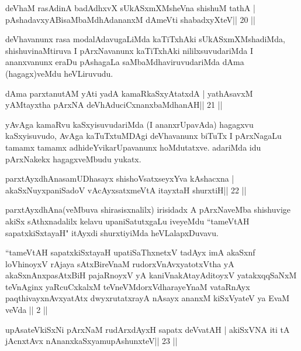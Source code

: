 \begin{shl}
deVhaM rasAdinA badAdhxvX sUkASxmXMsheVna shishuM tathA |
pAshadavxyABisaMbaMdhAdananxM dAmeVti shabadxyXteV\hfill || 20 ||
\end{shl}

\begin{artha}
deVhavanunx rasa modalAdavugaLiMda kaTiTxhAki sUkASxmXMshadiMda, shishuvinaMtiruva I pArxNavanunx kaTiTxhAki nililxsuvudariMda I ananxvanunx eraDu pAshagaLa saMbaMdhaviruvudariMda dAma (hagagx)veMdu heVLiruvudu.
\end{artha}

\begin{shl}
dAma parxtanutAM yAti yadA kamaRkaSxyAtatxdA |
yathAsavxM yAMtayxtha pArxNA deVhAduciCxnanxbaMdhanAH\hfill || 21 ||
\end{shl}

\begin{artha}
yAvAga kamaRvu kaSxyisuvudariMda (I ananxrUpavAda) hagagxvu kaSxyisuvudo, AvAga kaTuTxtuMDAgi deVhavanunx biTuTx I pArxNagaLu tamamx tamamx adhideYvikarUpavanunx hoMdutatxve. adariMda idu pArxNakekx hagagxveMbudu yukatx.
\end{artha}

\begin{shl}
parxtAyxdhAnasamUDhasayx shishoVsatxseyxYva kAshacxna |
akaSxNuyxpaniSadoV vAcAyxsatxmeVtA itayxtaH shurxtiH\hfill || 22 ||
\end{shl}

\begin{artha}
parxtAyxdhAna(veMbuva shirasisxnalilx) irisidadx A pArxNaveMba shishuvige akiSx sAthxnadalilx kelavu upaniSatutxgaLu iveyeMdu ``tameVtAH sapatxkiSxtayaH" itAyxdi shurxtiyiMda heVLalapxDuvavu.
\end{artha}


{}

\begin{shl}
``tameVtAH sapatxkiSxtayaH upatiSaThxnetxV tadAyx imA akaSxnf
  loVhinoyxV rAjaya sAtxBireVnaM rudorxV\s nAvxyatotxV\s tha yA
  akaSxnAnxpasAtxBiH pajaRnoyxV yA kaniVnakAtayA\s ditoyxV
  yatakxqqSaNxM teVnAginx yaRcuCxkalxM teVneVMdorxV\s dharayeYnaM
  vataRnAyx paqthivayxnAvxyatAtx dwyxrutatxrayA nAsayx ananxM
  kiSxVyateV ya EvaM veVda || 2 || 
\end{shl}


\begin{shl}
upAsateV\s kiSxNi pArxNaM rudArxdAyxH sapatx deVvatAH |
akiSxVNA iti tA jAcnxtAvx nAnanxkaSxyamupAshunxteV\hfill || 23 ||
\end{shl}

